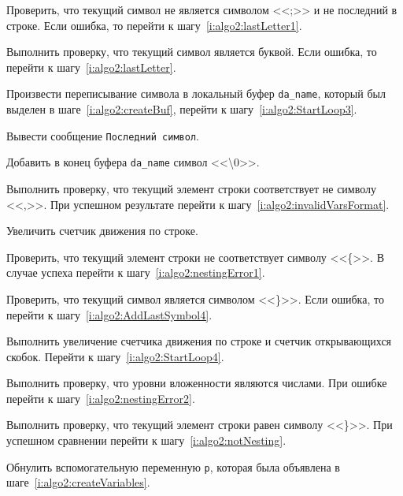 \begin{enumerate_step}
    \item \label{i:algo2:StartLoop3} Проверить, что текущий символ не является символом <<;>> и не последний в строке. Если ошибка, то перейти к шагу~\ref{i:algo2:lastLetter1}.
    \item Выполнить проверку, что текущий символ является буквой. Если ошибка, то перейти к шагу~\ref{i:algo2:lastLetter}.
    \item Произвести переписывание символа в локальный буфер \lstinline{da_name}, который был выделен в шаге~\ref{i:algo2:createBuf}, перейти к шагу~\ref{i:algo2:StartLoop3}.
    \item \label{i:algo2:lastLetter} Вывести сообщение \texttt{Последний символ}.
    \item \label{i:algo2:lastLetter1} Добавить в конец буфера \lstinline{da_name} символ <<\textbackslash 0>>.
    \item Выполнить проверку, что текущий элемент строки соответствует не символу <<,>>. При успешном результате перейти к шагу~\ref{i:algo2:invalidVarsFormat}.
    \item Увеличить счетчик движения по строке.
    \item Проверить, что текущий элемент строки не соответствует символу <<\{>>. В случае успеха перейти к шагу~\ref{i:algo2:nestingError1}.
    \item \label{i:algo2:StartLoop4} Проверить, что текущий символ является символом <<\}>>. Если ошибка, то перейти к шагу~\ref{i:algo2:AddLastSymbol4}.
    \item Выполнить увеличение счетчика движения по строке и счетчик открывающихся скобок. Перейти к шагу~\ref{i:algo2:StartLoop4}.
    \item \label{i:algo2:AddLastSymbol4} Выполнить проверку, что уровни вложенности являются числами. При ошибке перейти к шагу~\ref{i:algo2:nestingError2}.
    \item Выполнить проверку, что текущий элемент строки равен символу <<\}>>. При успешном сравнении перейти к шагу~\ref{i:algo2:notNesting}.
    \item Обнулить вспомогательную переменную \lstinline{p}, которая была объявлена в шаге~\ref{i:algo2:createVariables}.


\end{enumerate_step}

